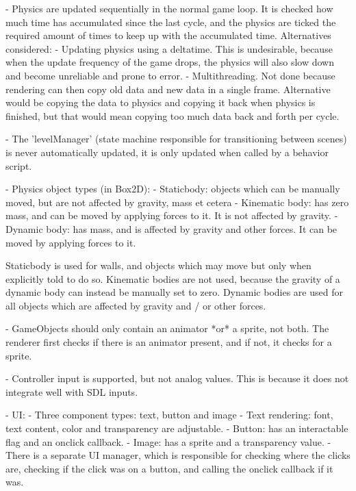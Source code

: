 - Physics are updated sequentially in the normal game loop. It is checked how much time has accumulated since the last cycle, and the physics are ticked the required amount of times to keep up with the accumulated time.
  Alternatives considered:
    - Updating physics using a deltatime. This is undesirable, because when the update frequency of the game drops, the physics will also slow down and become unreliable and prone to error.
    - Multithreading. Not done because rendering can then copy old data and new data in a single frame. Alternative would be copying the data to physics and copying it back when physics is finished, but that would mean copying too much data back and forth per cycle.

- The 'levelManager' (state machine responsible for transitioning between scenes) is never automatically updated, it is only updated when called by a behavior script.

- Physics object types (in Box2D):
  - Staticbody: objects which can be manually moved, but are not affected by gravity, mass et cetera
  - Kinematic body: has zero mass, and can be moved by applying forces to it. It is not affected by gravity.
  - Dynamic body: has mass, and is affected by gravity and other forces. It can be moved by applying forces to it.

Staticbody is used for walls, and objects which may move but only when explicitly told to do so.
Kinematic bodies are not used, because the gravity of a dynamic body can instead be manually set to zero.
Dynamic bodies are used for all objects which are affected by gravity and / or other forces.

- GameObjects should only contain an animator *or* a sprite, not both. The renderer first checks if there is an animator present, and if not, it checks for a sprite.

- Controller input is supported, but not analog values. This is because it does not integrate well with SDL inputs.

- UI:
  - Three component types: text, button and image
  - Text rendering: font, text content, color and transparency are adjustable.
  - Button: has an interactable flag and an onclick callback.
  - Image: has a sprite and a transparency value.
  - There is a separate UI manager, which is responsible for checking where the clicks are, checking if the click was on a button, and calling the onclick callback if it was.
